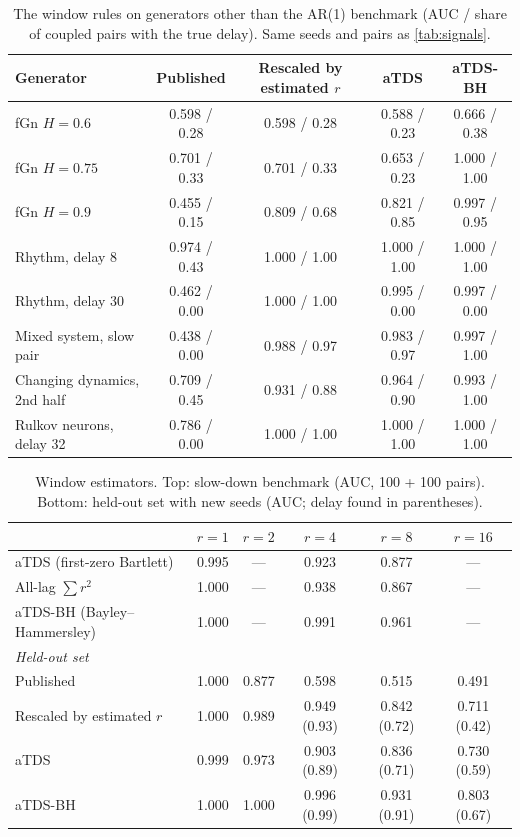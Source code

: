 \documentclass[11pt,a4paper]{article}
\begin{document}
\begin{table}[t]
\centering
\caption{The window rules on generators other than the AR(1) benchmark (AUC / share of coupled pairs with the true delay). Same seeds and pairs as \cref{tab:signals}.}
\label{tab:generalise}
\footnotesize
\begin{tabular}{lcccc}
\toprule
Generator & Published & Rescaled by estimated $r$ & aTDS & aTDS-BH \\
\midrule
fGn $H = 0.6$ & 0.598 / 0.28 & 0.598 / 0.28 & 0.588 / 0.23 & 0.666 / 0.38 \\
fGn $H = 0.75$ & 0.701 / 0.33 & 0.701 / 0.33 & 0.653 / 0.23 & 1.000 / 1.00 \\
fGn $H = 0.9$ & 0.455 / 0.15 & 0.809 / 0.68 & 0.821 / 0.85 & 0.997 / 0.95 \\
Rhythm, delay 8 & 0.974 / 0.43 & 1.000 / 1.00 & 1.000 / 1.00 & 1.000 / 1.00 \\
Rhythm, delay 30 & 0.462 / 0.00 & 1.000 / 1.00 & 0.995 / 0.00 & 0.997 / 0.00 \\
Mixed system, slow pair & 0.438 / 0.00 & 0.988 / 0.97 & 0.983 / 0.97 & 0.997 / 1.00 \\
Changing dynamics, 2nd half & 0.709 / 0.45 & 0.931 / 0.88 & 0.964 / 0.90 & 0.993 / 1.00 \\
Rulkov neurons, delay 32 & 0.786 / 0.00 & 1.000 / 1.00 & 1.000 / 1.00 & 1.000 / 1.00 \\
\bottomrule
\end{tabular}
\end{table}

\begin{table}[t]
\centering
\caption{Window estimators. Top: slow-down benchmark (AUC, 100 + 100 pairs). Bottom: held-out set with new seeds (AUC; delay found in parentheses).}
\label{tab:bh}
\footnotesize
\begin{tabular}{lccccc}
\toprule
 & $r = 1$ & $r = 2$ & $r = 4$ & $r = 8$ & $r = 16$ \\
\midrule
aTDS (first-zero Bartlett) & 0.995 & --- & 0.923 & 0.877 & --- \\
All-lag $\sum r^2$ & 1.000 & --- & 0.938 & 0.867 & --- \\
aTDS-BH (Bayley--Hammersley) & 1.000 & --- & 0.991 & 0.961 & --- \\
\midrule
\multicolumn{6}{l}{\emph{Held-out set}} \\
Published & 1.000 & 0.877 & 0.598 & 0.515 & 0.491 \\
Rescaled by estimated $r$ & 1.000 & 0.989 & 0.949 (0.93) & 0.842 (0.72) & 0.711 (0.42) \\
aTDS & 0.999 & 0.973 & 0.903 (0.89) & 0.836 (0.71) & 0.730 (0.59) \\
aTDS-BH & 1.000 & 1.000 & 0.996 (0.99) & 0.931 (0.91) & 0.803 (0.67) \\
\bottomrule
\end{tabular}
\end{table}
\end{document}
